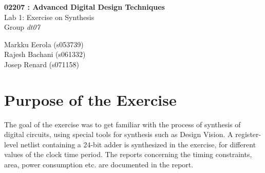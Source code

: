 \documentclass[11pt,a4paper]{article}
\begin{document}
	

\begin{titlepage}

\thispagestyle{fancy}
\lhead{}
\rhead{}
\rule{0pt}{50pt}
\vspace{3cm}

\begin{center}

 	\huge{\textbf{02207 : Advanced Digital Design Techniques}}\\
 	\vspace{1cm}
 	\huge{Lab 1: Exercise on Synthesis}\\
 	\vspace{1cm}
 	\huge{Group \textit{dt07}}\\	
\end{center}

\vspace{4cm}

\begin{flushright}
	\LARGE{Markku Eerola (s053739)}\\
	\vspace{0.3cm}
	\LARGE{Rajesh Bachani (s061332)}\\
	\vspace{0.3cm}
	\LARGE{Josep Renard (s071158)}\\
\end{flushright}
\cfoot{\today}
\end{titlepage}


\newpage 
\tableofcontents

\newpage 
\section{Purpose of the Exercise}

The goal of the exercise was to get familiar with the process of synthesis of digital circuits, using special tools for synthesis such as Design Vision. A register-level netlist containing a 24-bit adder is synthesized in the exercise, for different values of the clock time period. The reports concerning the timing constraints, area, power consumption etc. are documented in the report.
\end{document}
